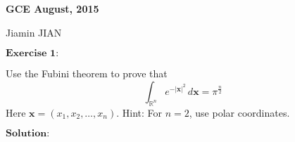 \documentclass[12pt,a4paper]{ctexart}
\begin{document}
\begin{center}
\textbf{ GCE August, 2015}
\vspace{8pt}

Jiamin JIAN
\end{center}

\vspace{12pt}

$\textbf{Exercise 1:}$

Use the Fubini theorem to prove that
\begin{equation*}
    \int_{\mathbb{R}^{n}}^{} e^{- |\textbf{x}|^{2}} \, d \textbf{x} = \pi^{\frac{n}{2}}
\end{equation*}
Here $\textbf{x} = (x_{1}, x_{2}, \dots, x_{n})$. Hint: For $n = 2$, use polar coordinates.


\vspace{8pt}

$\textbf{Solution:}$
\end{document}
